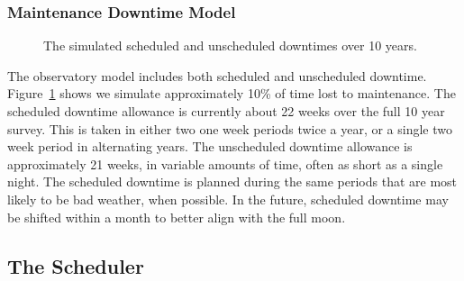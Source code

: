 \subsubsection{Maintenance Downtime Model}

\begin{figure}
\caption{The simulated scheduled and unscheduled downtimes over 10 years.}\label{fig:downtime}
\end{figure}

The observatory model includes both scheduled and unscheduled downtime. Figure~\ref{fig:downtime} shows we simulate approximately 10\% of time lost to maintenance. The scheduled downtime allowance is currently about 22 weeks over the full 10 year survey. This is taken in either two one week periods twice a year, or a single two week period in alternating years. The unscheduled downtime allowance is approximately 21 weeks, in variable amounts of time, often as short as a single night. The scheduled downtime is planned during the same periods that are most likely to be bad weather, when possible. In the future, scheduled downtime may be shifted within a month to better align with the full moon.


\subsection{The Scheduler}

